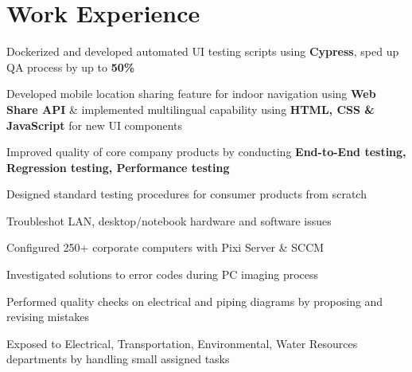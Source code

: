 \documentclass[]{morris-cv}
\begin{document}
\hfill
\begin{minipage}[t]{0.67\textwidth} 


\section{Work Experience}
\vspace{\topsep} %
\begin{tightemize}
\item Dockerized and developed automated UI testing scripts using \textbf{Cypress},
sped up QA process by up to \textbf{50\%}
\item Developed mobile location sharing feature for indoor navigation using \textbf{Web Share API} \& implemented multilingual capability using \textbf{HTML, CSS \& JavaScript} for new UI components
\item Improved quality of core company products by conducting \textbf{End-to-End testing, Regression testing, Performance testing}
\item Designed standard testing procedures for consumer products from scratch
\end{tightemize}
\sectionsep

\begin{tightemize}
\item Troubleshot LAN, desktop/notebook hardware and software issues
\item Configured 250+ corporate computers with Pixi Server \& SCCM
\item Investigated solutions to error codes during PC imaging process
\end{tightemize}
\sectionsep

\begin{tightemize}
\item Performed quality checks on electrical and piping diagrams by proposing and revising mistakes
\item Exposed to Electrical, Transportation, Environmental, Water Resources departments by handling small assigned tasks
\end{tightemize}
\sectionsep


\end{minipage}
\end{document}
